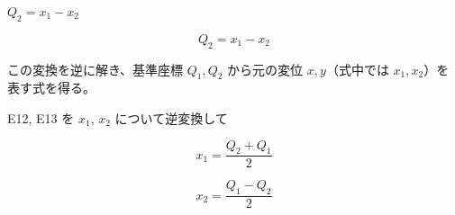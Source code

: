 \documentclass[dvipdfmx,a4paper,11pt]{jsarticle}
\begin{document}
$Q_2 = x_1 - x_2$

\begin{equation}
  Q_2 = x_1 - x_2
  \label{eq:E13}
\end{equation}

この変換を逆に解き、基準座標 $Q_1,Q_2$ から元の変位 $x,y$（式中では $x_1,x_2$）を表す式を得る。

E12, E13 を $x_1$, $x_2$ について逆変換して

\begin{equation}
  x_{1} = \frac{Q_{2}+Q_{1}}{2}
  \label{eq:E14}
\end{equation}

\begin{equation}
  x_{2} = \frac{Q_{1}-Q_{2}}{2}
  \label{eq:E15}
\end{equation}
\end{document}
